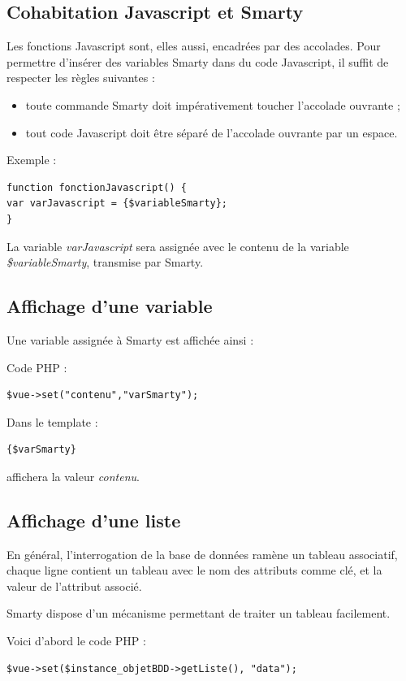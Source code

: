 \subsection{Cohabitation Javascript et Smarty}

Les fonctions Javascript sont, elles aussi, encadrées par des accolades. Pour permettre d'insérer des variables Smarty dans du code Javascript, il suffit de respecter les règles suivantes :
\begin{itemize}
\item toute commande Smarty doit impérativement toucher l'accolade ouvrante ;
\item tout code Javascript doit être séparé de l'accolade ouvrante par un espace.
\end{itemize}

Exemple :
\begin{lstlisting}
function fonctionJavascript() {
var varJavascript = {$variableSmarty};
}
\end{lstlisting}

La variable \textit{varJavascript} sera assignée avec le contenu de la variable \textit{\$variableSmarty}, transmise par Smarty.

\subsection{Affichage d'une variable}

Une variable assignée à Smarty est affichée ainsi :

Code PHP :
\begin{lstlisting}
$vue->set("contenu","varSmarty");
\end{lstlisting}

Dans le template :
\begin{lstlisting}
{$varSmarty}
\end{lstlisting}
affichera la valeur \textit{contenu}.


\subsection{Affichage d'une liste}
En général, l'interrogation de la base de données ramène un tableau associatif, chaque ligne contient un tableau avec le nom des attributs comme clé, et la valeur de l'attribut associé.

Smarty dispose d'un mécanisme permettant de traiter un tableau facilement.

Voici d'abord le code PHP :
\begin{lstlisting} 
$vue->set($instance_objetBDD->getListe(), "data");
\end{lstlisting}

